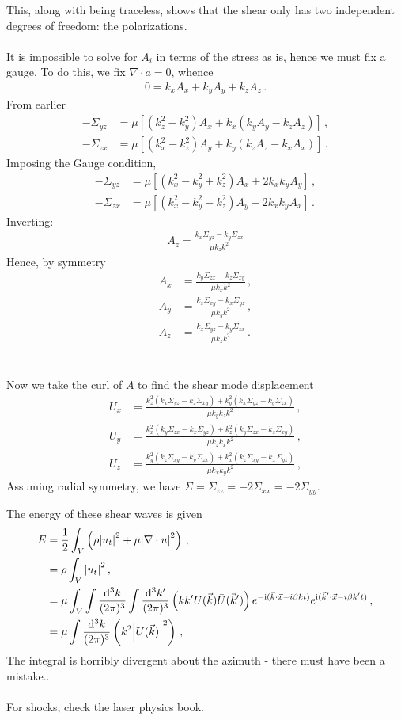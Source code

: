 \documentclass{article}
\newcommand*\diff{\mathop{}\!\mathrm{d}}
\newcommand*\te[1]{\text{#1}}
\newcommand*\p[1]{\left(#1\right)}
\newcommand*\ps[1]{\left[#1\right]}
\newcommand*\f[2]{\frac{#1}{#2}}
\newcommand*\I{\te{i}}
\begin{document}
This, along with being traceless, shows that the shear only has two independent degrees of freedom: the polarizations.
\\\\
It is impossible to solve for $A_i$ in terms of the stress as is, hence we must fix a gauge. To do this, we fix $\nabla\cdot a=0$, whence
\begin{align}
0=k_xA_x+k_yA_y+k_zA_z\,.
\end{align}
From earlier
\begin{align}
-\Sigma_{yz}&=\mu\ps{(k_z^2-k_y^2) A_x+k_x(k_y A_y-k_z A_z)}\,,\\
-\Sigma_{zx}&=\mu\ps{(k_x^2-k_z^2) A_y+k_y(k_z A_z-k_x A_x)}\,.
\end{align}
Imposing the Gauge condition,
\begin{align}
-\Sigma_{yz}&=\mu\ps{(k_x^2-k_y^2+k_z^2) A_x+2k_xk_y A_y}\,,\\
-\Sigma_{zx}&=\mu\ps{(k_x^2-k_y^2-k_z^2) A_y-2k_x k_y A_x}\,.
\end{align}
Inverting:
\begin{align}
A_z=\f{k_x\Sigma_{yz}-k_y\Sigma_{zx}}{\mu k_z k^2}
\end{align}
Hence, by symmetry
\begin{align}
A_x&=\f{k_y\Sigma_{zx}-k_z\Sigma_{xy}}{\mu k_x k^2}\,,\\
A_y&=\f{k_z\Sigma_{xy}-k_x\Sigma_{yz}}{\mu k_y k^2}\,,\\
A_z&=\f{k_x\Sigma_{yz}-k_y\Sigma_{zx}}{\mu k_z k^2}\,.
\end{align}
\\\\
Now we take the curl of $A$ to find the shear mode displacement
\begin{align}
U_x&=\f{k_z^2(k_x\Sigma_{yz}-k_z\Sigma_{xy})+k_y^2(k_x\Sigma_{yz}-k_y\Sigma_{zx})}{\mu k_y k_z k^2}\,,\\
U_y&=\f{k_x^2(k_y\Sigma_{zx}-k_x\Sigma_{yz})+k_z^2(k_y\Sigma_{zx}-k_z\Sigma_{xy})}{\mu k_z k_x k^2}\,,\\
U_z&=\f{k_y^2(k_z\Sigma_{xy}-k_y\Sigma_{zx})+k_x^2(k_z\Sigma_{xy}-k_x\Sigma_{yz})}{\mu k_x k_y k^2}\,,
\end{align}
Assuming radial symmetry, we have $\Sigma=\Sigma_{zz}=-2\Sigma_{xx}=-2\Sigma_{yy}$.

The energy of these shear waves is given
\begin{align}
E&=\f12\int_V\p{\rho\abs{u_t}^2+\mu\abs{\nabla\cdot u}^2}\,,\\
&=\rho\int_V\abs{u_t}^2\,,\\
&=\mu\int_V\int\f{\diff^3 k}{(2\pi)^3}\int\f{\diff^3 k'}{(2\pi)^3}\p{k k'U(\vec k)\bar U(\vec k')}e^{-\I(\vec k\cdot\vec x-i\beta k t)}e^{\I(\vec k'\cdot\vec x-i\beta k' t)}\,,\\
&=\mu\int\f{\diff^3 k}{(2\pi)^3}\p{k^2\abs{U(\vec k)}^2}\,,\\
\end{align}
The integral is horribly divergent about the azimuth - there must have been a mistake...
\\\\
For shocks, check the laser physics book.
\end{document}
